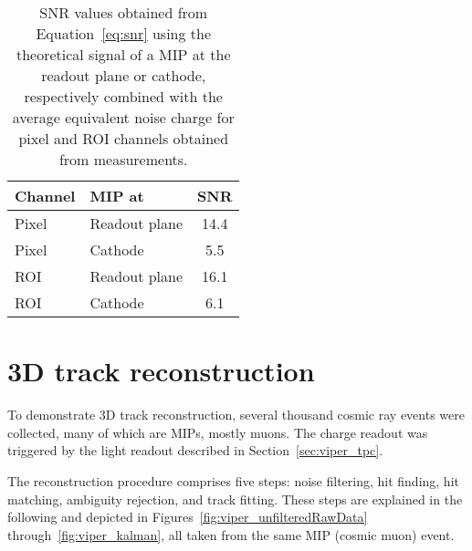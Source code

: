 \begin{table}[htb]
	\centering
	\caption{SNR values obtained from Equation~\eqref{eq:snr} using the theoretical signal of a MIP at the readout plane or cathode, respectively combined with the average equivalent noise charge for pixel and ROI channels obtained from measurements.}
	\label{tab:viper_snr}
	\begin{tabu} to \textwidth {|l|l|S|}
		\hline
		{Channel} &	{MIP at} &			{SNR} \\
		\hline
		\hline
		{Pixel} &	{Readout plane} &	\num{14.4} \\
		\hline
		{Pixel} &	{Cathode} &			\num{5.5} \\
		\hline
		{ROI} &		{Readout plane} &	\num{16.1} \\
		\hline
		{ROI} &		{Cathode} &			\num{6.1} \\
		\hline
	\end{tabu}
\end{table}


\section{3D track reconstruction}
\label{sec:viper_reco}


To demonstrate 3D track reconstruction, several thousand cosmic ray events were collected, many of which are MIPs, mostly muons.
The charge readout was triggered by the light readout described in Section~\ref{sec:viper_tpc}.

The reconstruction procedure comprises five steps: noise filtering, hit finding, hit matching, ambiguity rejection, and track fitting.
These steps are explained in the following and depicted in Figures~\ref{fig:viper_unfilteredRawData} through~\ref{fig:viper_kalman}, all taken from the same MIP (cosmic muon) event.

